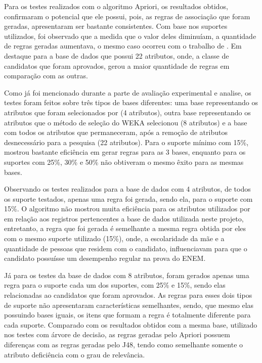 \par
Para os testes realizados com o algoritmo Apriori, os resultados obtidos, confirmaram o potencial que ele possui, pois, as regras de associação que foram geradas, apresentaram ser bastante consistentes. Com base nos suportes utilizados, foi observado que a medida que o valor deles diminuíam, a quantidade de regras geradas aumentava, o mesmo caso ocorreu com o trabalho de . Em destaque para a base de dados que possui 22 atributos, onde, a classe de candidatos que foram aprovados, gerou a maior quantidade de regras em comparação com as outras.

\par
Como já foi mencionado durante a parte de avaliação experimental e analise, os testes foram feitos sobre três tipos de bases diferentes: uma base representando os atributos que foram selecionados por  (4 atributos), outra base representando os atributos que o método de seleção do WEKA selecionou (8 atributos) e a base com todos os atributos que permaneceram, após a remoção de atributos desnecessário para a pesquisa (22 atributos). Para o suporte mínimo com 15\%, mostrou bastante eficiência em gerar regras para as 3 bases, enquanto para os suportes com 25\%, 30\% e 50\% não obtiveram o mesmo êxito para as mesmas bases.

\par
Observando os testes realizados para a base de dados com 4 atributos, de todos os suporte testados, apenas uma regra foi gerada, sendo ela, para o suporte com 15\%. O algoritmo não mostrou muita eficiência para os atributos utilizados por  em relação  aos registros pertencentes a base de dados utilizada neste projeto, entretanto, a regra que foi gerada é semelhante a mesma regra obtida por eles com o mesmo suporte utilizado (15\%), onde, a escolaridade da mãe e a quantidade de pessoas que residem com o candidato, influenciavam para que o candidato possuísse um desempenho regular na prova do ENEM.

\par
Já para os testes da base de dados com 8 atributos, foram gerados apenas uma regra para o suporte cada um dos suportes, com 25\% e 15\%, sendo elas relacionadas ao candidatos que foram aprovados. As regras para esses dois tipos de suporte não apresentaram características semelhantes, sendo, que mesmo elas possuindo bases iguais, os itens que formam a regra é totalmente diferente para cada suporte. Comparado com os resultados obtidos com a mesma base, utilizado nos testes com árvore de decisão, as regras geradas pelo Apriori possuem diferenças com as regras geradas pelo J48, tendo como semelhante somente o atributo deficiência com o grau de relevância.

